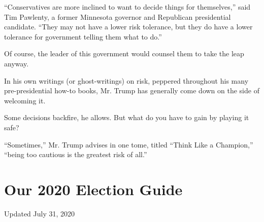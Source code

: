 ``Conservatives are more inclined to want to decide things for
themselves,'' said Tim Pawlenty, a former Minnesota governor and
Republican presidential candidate. ``They may not have a lower risk
tolerance, but they do have a lower tolerance for government telling
them what to do.''

Of course, the leader of this government would counsel them to take the
leap anyway.

In his own writings (or ghost-writings) on risk, peppered throughout his
many pre-presidential how-to books, Mr. Trump has generally come down on
the side of welcoming it.

Some decisions backfire, he allows. But what do you have to gain by
playing it safe?

``Sometimes,'' Mr. Trump advises in one tome, titled ``Think Like a
Champion,'' ``being too cautious is the greatest risk of all.''

\hypertarget{our-2020-election-guide}{%
\section{Our 2020 Election Guide}\label{our-2020-election-guide}}

Updated July 31, 2020

